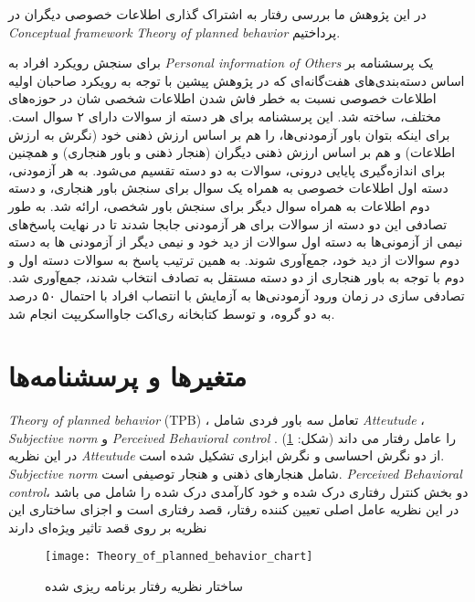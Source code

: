 در این پژوهش ما بررسی رفتار به اشتراک گذاری اطلاعات خصوصی دیگران در
\textit{
  \gls{Conceptual framework}
}
\textit{
  \gls{Theory of planned behavior}
}
پرداختیم.

برای سنجش رویکرد‍ افراد به
\textit{
  \gls{Personal information of Others}
}
یک پرسشنامه بر اساس دسته‌بندی‌های هفت‌گانه‌ای که در پژوهش پیشین با توجه به رویکرد صاحبان
اولیه اطلاعات خصوصی نسبت به خطر فاش شدن اطلاعات شخصی شان در حوزه‌های مختلف، ساخته شد.
این پرسشنامه برای هر دسته از سوالات دارای ۲ سوال است. برای اینکه بتوان باور
آزمودنی‌ها، را هم بر اساس ارزش ذهنی خود
\!(نگرش به ارزش اطلاعات)
و هم بر اساس ارزش ذهنی دیگران
\!(هنجار ذهنی و باور هنجاری)
و همچنین برای اندازه‌گیری پایایی درونی،
سوالات به دو دسته تقسیم ‌می‌شود.
به هر آزمودنی، دسته اول اطلاعات خصوصی به همراه یک سوال برای سنجش باور هنجاری، و دسته دوم
اطلاعات به همراه سوال دیگر برای سنجش باور شخصی، ارائه شد. به طور تصادفی این دو دسته از
سوالات برای هر آزمودنی جابجا شدند تا در نهایت پاسخ‌های نیمی از آزمونی‌ها به دسته اول سوالات از دید خود و نیمی
دیگر از آزمودنی ها به دسته دوم سوالات از دید خود، جمع‌آوری شوند. به همین ترتیب پاسخ به سوالات دسته اول و دوم
با توجه به باور هنجاری از دو دسته مستقل به تصادف انتخاب شدند، جمع‌آوری شد. تصادفی سازی در زمان ورود آزمودنی‌ها
به آزمایش با انتصاب افراد با احتمال ۵۰ درصد به دو گروه، و توسط کتابخانه ری‌اکت جاوااسکریپت انجام شد.

\section{متغیر‌ها و پرسشنامه‌ها}

\ifPlennedBahaviorTheory
  \textit{\gls{Theory of planned behavior}}
  \!(TPB)
  ، تعامل سه باور فردی شامل
  \textit{\gls{Atteutude}} ،
  \textit{\gls{Subjective norm}} و
  \textit{\gls{Perceived Behavioral control}}
  را عامل رفتار می داند
  \!(شکل: \ref{fig:Theory_of_planned_behavior_chart})
  \!\citep{ajzenTheoryPlannedBehavior2020}.
  در این نظریه
  \textit{\gls{Atteutude}}
  از دو نگرش احساسی و نگرش ابزاری تشکیل شده است.
  \textit{\gls{Subjective norm}}
  شامل  هنجارهای ذهنی و هنجار توصیفی است.
  \textit{\gls{Perceived Behavioral control}}،
  دو بخش کنترل رفتاری درک شده و خود کارآمدی درک شده را شامل می باشد
  در این نظریه عامل اصلی تعیین کننده
  رفتار، قصد رفتاری است و اجزای ساختاری این نظریه
  بر روی قصد تاثیر ویژه‌ای دارند
  \citep{mhmdpwrBrrsyTthyrTywry2022}
  \begin{figure}[ht]
    \centerline{\texttt{[image: Theory\_of\_planned\_behavior\_chart]}}
    \caption{ساختار نظریه رفتار برنامه ریزی شده
    }
    \label{fig:Theory_of_planned_behavior_chart}
  \end{figure}\\

